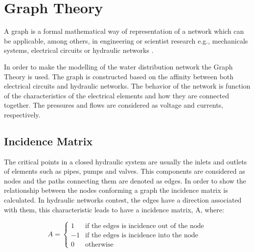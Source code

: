 \section{Graph Theory}  
\label{GraphTheory}
A graph is a formal mathematical way of representation of a network which can be applicable, among others, 
in engineering or scientist research e.g., mechanicals systems, electrical circuits or hydraulic networks \cite{graph_intro}. 

In order to make the modelling of the water distribution network the Graph Theory is used. The graph is constructed 
based on the affinity between both electrical circuits and hydraulic networks. 
The behavior of the network is function of the characteristics of the 
electrical elements and how they are connected together. The pressures and flows are considered as 
voltage and currents, respectively.

\subsection{Incidence Matrix} 

The critical points in a closed hydraulic system are usually the inlets and outlets of elements such as pipes, pumps and valves. 
This components are considered as nodes and the paths connecting them are denoted as edges. 
In order to show the relationship between the nodes conforming a graph the 
incidence matrix is calculated. In hydraulic networks contest, the edges have a 
direction associated with them, this characteristic leads to have a incidence matrix, A, where:

\begin{equation}
\label{DiGraph}
 A =
		\left\{
		\begin{array}{ll}
		
		1 			&      \text{if the edges is incidence out of the node}	
\\
		-1                       &     \text{if the edges is incidence into the node}
\\

                0                       &      \text{otherwise}

		\end{array}
		\right.
\end{equation}	


 
%
%


 
 
 